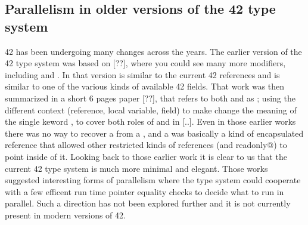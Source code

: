 \subsection*{Parallelism in older versions of the 42 type system}
42 has been undergoing many changes across the years.
The earlier version of the 42 type system was based on [??],
where you could see many more modifiers, including
\Q@fresh@ and \Q@baloon@.
In that version \Q@fresh@ is similar to the current 42 \Q@capsule@ references and \Q@baloon@ is similar to one of the various kinds of available 42 \Q@capsule@ fields.
That work was then summarized in a short 6 pages paper [??], that
refers to both \Q@fresh@ and \Q@baloon@ as \Q@baloon@; using the different context (reference, local variable, field) to make change the meaning of the single keword \Q@baloon@, to cover both roles of \Q@fresh@ and \Q@baloon@ in [..].
Even in those earlier works there was no way to recover a \Q@fresh@ from a \Q@baloon@, and a \Q@baloon@ was basically a kind of encapsulated reference that allowed other restricted kinds of references (\Q@external@ and \Q@external readonly@) to point inside of it. Looking back to those earlier work it is clear to us that the current 42 type system is much more minimal and elegant.
Those works suggested interesting forms of parallelism where the type system could cooperate with a few efficent run time pointer equality checks to decide what to run in parallel.
Such a direction has not been explored further and it is not currently present in modern versions of 42.